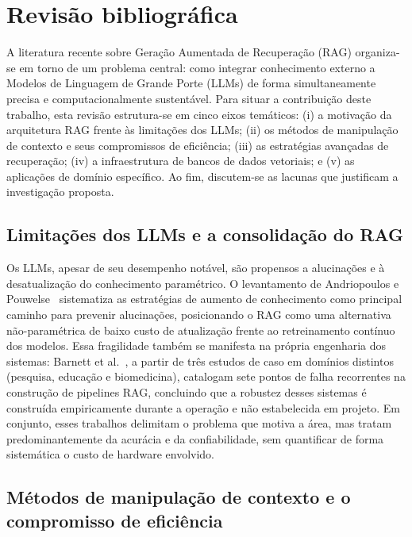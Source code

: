 \newpage
\section{Revisão bibliográfica}
\label{sc:revisao}

A literatura recente sobre Geração Aumentada de Recuperação (RAG) organiza-se em torno de um problema central: como integrar conhecimento externo a Modelos de Linguagem de Grande Porte (LLMs) de forma simultaneamente precisa e computacionalmente sustentável. Para situar a contribuição deste trabalho, esta revisão estrutura-se em cinco eixos temáticos: (i) a motivação da arquitetura RAG frente às limitações dos LLMs; (ii) os métodos de manipulação de contexto e seus compromissos de eficiência; (iii) as estratégias avançadas de recuperação; (iv) a infraestrutura de bancos de dados vetoriais; e (v) as aplicações de domínio específico. Ao fim, discutem-se as lacunas que justificam a investigação proposta.

\subsection{Limitações dos LLMs e a consolidação do RAG}

Os LLMs, apesar de seu desempenho notável, são propensos a alucinações e à desatualização do conhecimento paramétrico. O levantamento de Andriopoulos e Pouwelse~\cite{andriopoulos2023augmenting} sistematiza as estratégias de aumento de conhecimento como principal caminho para prevenir alucinações, posicionando o RAG como uma alternativa não-paramétrica de baixo custo de atualização frente ao retreinamento contínuo dos modelos. Essa fragilidade também se manifesta na própria engenharia dos sistemas: Barnett et al.~\cite{barnett2024seven}, a partir de três estudos de caso em domínios distintos (pesquisa, educação e biomedicina), catalogam sete pontos de falha recorrentes na construção de pipelines RAG, concluindo que a robustez desses sistemas é construída empiricamente durante a operação e não estabelecida em projeto. Em conjunto, esses trabalhos delimitam o problema que motiva a área, mas tratam predominantemente da acurácia e da confiabilidade, sem quantificar de forma sistemática o custo de hardware envolvido.

\subsection{Métodos de manipulação de contexto e o compromisso de eficiência}

